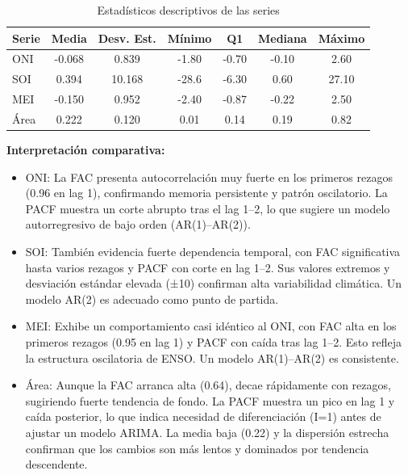 \begin{table}[H]
    \centering
    \caption{Estadísticos descriptivos de las series}
    \label{tab:descriptivos}
    \begin{tabular}{lcccccc}
        \toprule
        Serie & Media & Desv. Est. & Mínimo & Q1 & Mediana & Máximo \\
        \midrule
        ONI   & -0.068 & 0.839 & -1.80 & -0.70 & -0.10 &  2.60 \\
        SOI   &  0.394 & 10.168 & -28.6 & -6.30 &  0.60 & 27.10 \\
        MEI   & -0.150 & 0.952 & -2.40 & -0.87 & -0.22 &  2.50 \\
        Área  &  0.222 & 0.120 &  0.01 &  0.14 &  0.19 &  0.82 \\
        \bottomrule
    \end{tabular}
\end{table}

\textbf{Interpretación comparativa:}

\begin{itemize}
    \item ONI: La FAC presenta autocorrelación muy fuerte en los primeros rezagos 
    (0.96 en lag 1), confirmando memoria persistente y patrón oscilatorio. La PACF muestra 
    un corte abrupto tras el lag 1–2, lo que sugiere un modelo autorregresivo de bajo orden 
    (AR(1)–AR(2)).
    
    \item SOI: También evidencia fuerte dependencia temporal, con FAC significativa 
    hasta varios rezagos y PACF con corte en lag 1–2. Sus valores extremos y desviación 
    estándar elevada (±10) confirman alta variabilidad climática. Un modelo AR(2) es adecuado 
    como punto de partida.
    
    \item MEI: Exhibe un comportamiento casi idéntico al ONI, con FAC alta en los 
    primeros rezagos (0.95 en lag 1) y PACF con caída tras lag 1–2. Esto refleja la estructura 
    oscilatoria de ENSO. Un modelo AR(1)–AR(2) es consistente.
    
    \item Área: Aunque la FAC arranca alta (0.64), decae rápidamente con rezagos, 
    sugiriendo fuerte tendencia de fondo. La PACF muestra un pico en lag 1 y caída posterior, 
    lo que indica necesidad de diferenciación (I=1) antes de ajustar un modelo ARIMA. La media 
    baja (0.22) y la dispersión estrecha confirman que los cambios son más lentos y dominados 
    por tendencia descendente.
\end{itemize}




